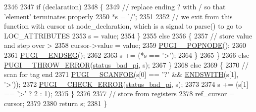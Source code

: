 \begin{DoxyCode}
2346 
2347                     \textcolor{keywordflow}{if} (declaration)
2348                     \{
2349                         \textcolor{comment}{// replace ending ? with / so that 'element' terminates properly}
2350                         *s = \textcolor{charliteral}{'/'};
2351 
2352                         \textcolor{comment}{// we exit from this function with cursor at node\_declaration, which is a signal to
       parse() to go to LOC\_ATTRIBUTES}
2353                         s = value;
2354                     \}
2355                     \textcolor{keywordflow}{else}
2356                     \{
2357                         \textcolor{comment}{// store value and step over >}
2358                         cursor->value = value;
2359                         \hyperlink{pugixml_8cpp_ab82f13ed99cc2d22c5ecb6e18b5dfe17}{PUGI\_\_POPNODE}();
2360 
2361                         \hyperlink{pugixml_8cpp_a39554337dd1d0fef32ddf9926ee4e4ae}{PUGI\_\_ENDSEG}();
2362 
2363                         s += (*s == \textcolor{charliteral}{'>'});
2364                     \}
2365                 \}
2366                 \textcolor{keywordflow}{else} \hyperlink{pugixml_8cpp_a8af02d87a10272f03f96ab93a96d7202}{PUGI\_\_THROW\_ERROR}(\hyperlink{namespacepugi_a9054ca609e12afb8f3e5892fc6c0b555ad7a57e8554aabea52ed8b0d6a0891622}{status\_bad\_pi}, s);
2367             \}
2368             \textcolor{keywordflow}{else}
2369             \{
2370                 \textcolor{comment}{// scan for tag end}
2371                 \hyperlink{pugixml_8cpp_a98386e86f2c7e7e477939d209a5bbf7e}{PUGI\_\_SCANFOR}(s[0] == \textcolor{charliteral}{'?'} && \hyperlink{pugixml_8cpp_a3a72d0b2c0e7f99940ce8fbcc69e532f}{ENDSWITH}(s[1], \textcolor{charliteral}{'>'}));
2372                 \hyperlink{pugixml_8cpp_a03531d9b3c74f0843567257537edfd53}{PUGI\_\_CHECK\_ERROR}(\hyperlink{namespacepugi_a9054ca609e12afb8f3e5892fc6c0b555ad7a57e8554aabea52ed8b0d6a0891622}{status\_bad\_pi}, s);
2373 
2374                 s += (s[1] == \textcolor{charliteral}{'>'} ? 2 : 1);
2375             \}
2376 
2377             \textcolor{comment}{// store from registers}
2378             ref\_cursor = cursor;
2379 
2380             \textcolor{keywordflow}{return} s;
2381         \}
\end{DoxyCode}



